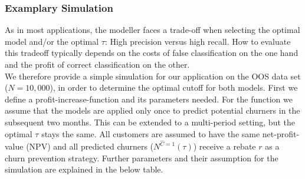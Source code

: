 \documentclass[12pt,titlepage]{article}
\begin{document}
\subsubsection*{Examplary Simulation}

As in most applications, the modeller faces a trade-off when selecting the optimal model and/or the optimal $\tau$: High precision versus high recall. How to evaluate this tradeoff typically depends on the costs of false classification on the one hand and the profit of correct classification on the other. \\
We therefore provide a simple simulation for our application on the OOS data set ($N=10,000$), in order to determine the optimal cutoff for both models. First we define a profit-increase-function and its parameters needed. For the function we assume that the models are applied only once to predict potential churners in the subsequent two months. This can be extended to a multi-period setting, but the optimal $\tau$ stays the same. All customers are assumed to have the same net-profit-value (NPV) and all predicted churners ($N^{\hat{C}=1}(\tau)$) receive a rebate $r$ as a churn prevention strategy. Further parameters and their assumption for the simulation are explained in the below table. \\
\end{document}
